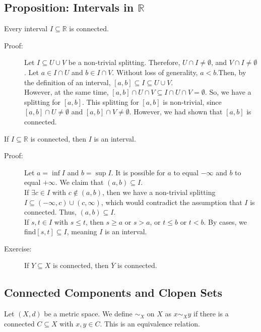 \documentclass[9pt]{extarticle}
\newcommand{\R}{\mathbb{R}}
\begin{document}
  \subsection{Proposition: Intervals in $\R$}%
  Every interval $I\subseteq \R$ is connected.
  \begin{description}
    \item[Proof:] Let $I\subseteq U\cup V$ be a non-trivial splitting. Therefore, $U\cap I \neq \emptyset$, and $V\cap I \neq \emptyset$. Let $a\in I\cap U$ and $b\in I\cap V$. Without loss of generality, $a < b$.Then, by the definition of an interval, $[a,b]\subseteq I\subseteq U\cup V$.\\

      However, at the same time, $[a,b]\cap U\cap V \subseteq I\cap U \cap V = \emptyset$. So, we have a splitting for $[a,b]$. This splitting for $[a,b]$ is non-trivial, since $[a,b]\cap U \neq \emptyset$ and $[a,b]\cap V \neq \emptyset$. However, we had shown that $[a,b]$ is connected.
  \end{description}
  If $I\subseteq \R$ is connected, then $I$ is an interval.
  \begin{description}
    \item[Proof:] Let $a = \inf I$ and $b = \sup I$. It is possible for $a$ to equal $-\infty$ and $b$ to equal $+\infty$. We claim that $(a,b)\subseteq I$.\\

      If $\exists c\in I$ with $c\notin (a,b)$, then we have a non-trivial splitting $I\subseteq (-\infty,c)\cup (c,\infty)$, which would contradict the assumption that $I$ is connected. Thus, $(a,b)\subseteq I$.\\

      If $s,t\in I$ with $s \leq t$, then $s\geq a$ or $s > a$, or $t\leq b$ or $t < b$. By cases, we find$[s,t]\subseteq I$, meaning $I$ is an interval.
    \item[Exercise:] If $Y\subseteq X$ is connected, then $\overline{Y}$ is connected.
  \end{description}
  \subsection{Connected Components and Clopen Sets}%
  Let $(X,d)$ be a metric space. We define $\sim_{X}$ on $X$ as $x\sim_{X}y$ if there is a connected $C\subseteq X$ with $x,y\in C$. This is an equivalence relation.\\
\end{document}
